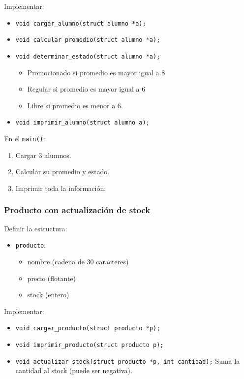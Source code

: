 Implementar:

\begin{itemize}
\item \texttt{void cargar\_alumno(struct alumno *a);}
\item \texttt{void calcular\_promedio(struct alumno *a);}
\item \texttt{void determinar\_estado(struct alumno *a);}
  \begin{itemize}
    \item Promocionado si promedio es mayor igual a 8
    \item Regular si promedio es mayor igual a 6
    \item Libre si promedio es menor a 6.
  \end{itemize}
\item \texttt{void imprimir\_alumno(struct alumno a);}
\end{itemize}

En el \texttt{main()}:

\begin{enumerate}
\item Cargar 3 alumnos.
\item Calcular su promedio y estado.
\item Imprimir toda la información.
\end{enumerate}

\subsubsection{Producto con actualización de stock}

Definir la estructura:

\begin{itemize}
\item \texttt{producto}:
\begin{itemize}
\item nombre (cadena de 30 caracteres)
\item precio (flotante)
\item stock (entero)
\end{itemize}
\end{itemize}

Implementar:

\begin{itemize}
\item \texttt{void cargar\_producto(struct producto *p);}
\item \texttt{void imprimir\_producto(struct producto p);}
\item \texttt{void actualizar\_stock(struct producto *p, int cantidad);}
Suma la cantidad al stock (puede ser negativa).
\end{itemize}

